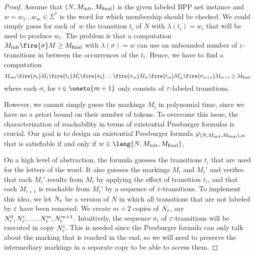 \documentclass[../../diss.tex]{subfiles}
\begin{document}
\begin{proof}
    Assume that $(N,M_{\text{init}},M_{\text{final}})$ is the given labeled BPP net instance and $w = w_1 \ldots w_m \in \Sigma^*$ is the word for which membership should be checked.
    We could simply guess for each  of~$w$ the transition $t_i$ of $N$ with $\lambda(t_i) = w_i$ that will be used to produce $w_i$.
    The problem is that a computation $\Minit \fire{\sigma} M \geq \Mfinal$ with $\lambda(\sigma) = w$ can use an unbounded number of $\varepsilon$-transitions in between the occurrences of the $t_i$.
    Hence, we have to find a computation
    \[
        \Minit \fire{\sigma_0} M_1 \fire{t_1} M_1' \fire{\sigma_2} \ldots \fire{\sigma_m} M_m \fire{t_m} M_m' \fire{\sigma_{m+1}} M_{m+1} \geq \Mfinal
    \]
    where each $\sigma_i$ for $i \in \oneto{m+1}$ only consists of $\varepsilon$-labeled transitions.

    However, we cannot simply guess the markings $M_i$ in polynomial time, since we have no a priori bound on their number of tokens.
    To overcome this issue, the characterization of reachability in terms of existential Presburger formulas is crucial.
    Our goal is to design an existential Presburger formula $\varphi_{(N,M_{\text{init}},M_{\text{final}}),w}$ that is satisfiable if and only if $w \in \lang{N,\Minit,\Mfinal}$,

    On a high level of abstraction, the formula guesses the transitions $t_i$ that are used for the letters of the word.
    It also guesses the markings $M_i$ and $M_i'$ and verifies that each $M_i'$ results from $M_i$ by applying the effect of transition $t_i$, and that each $M_{i+1}$ is reachable from $M_{i}'$ by a sequence of $\varepsilon$-transitions.
    To implement this idea, we let $N_\varepsilon$ be a version of $N$ in which all transitions that are not labeled by $\varepsilon$ have been removed.
    We create $m+2$ copies of $N_\varepsilon$, say $N_\varepsilon^0, N_\varepsilon^i, \ldots, N_\varepsilon^m, N_\varepsilon^{m+1}$.
    Intuitively, the sequence $\sigma_i$ of $\varepsilon$-transitions will be executed in copy $N_\varepsilon^i$.
    This is needed since the Presburger formula can only talk about the marking that is reached in the end, so we will need to preserve the intermediary markings in a separate copy to be able to access them.


\end{proof}
\end{document}
